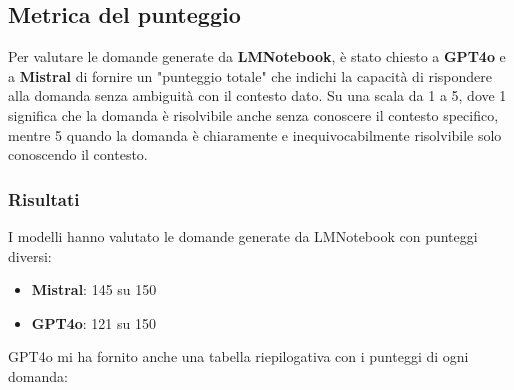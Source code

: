 \documentclass[12pt,a4paper,openright,twoside]{book}
\begin{document}
\subsection{Metrica del punteggio}
Per valutare le domande generate da \textbf{LMNotebook}, è stato chiesto a \textbf{GPT4o} e a \textbf{Mistral} di 
fornire un "punteggio totale" che indichi la capacità di rispondere alla domanda senza ambiguità con il contesto dato.
Su una scala da 1 a 5, dove 1 significa che la domanda è risolvibile anche senza conoscere il contesto specifico, mentre 5 quando la domanda è chiaramente e inequivocabilmente risolvibile solo conoscendo il contesto.
\subsubsection{Risultati}
I modelli hanno valutato le domande generate da LMNotebook con punteggi diversi:
\begin{itemize}
    \item \textbf{Mistral}: 145 su 150
    \item \textbf{GPT4o}: 121 su 150
\end{itemize}
GPT4o mi ha fornito anche una tabella riepilogativa con i punteggi di ogni domanda:
\end{document}
